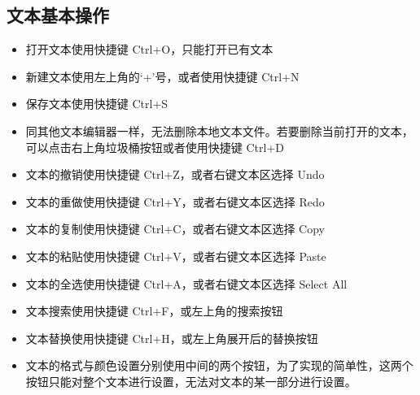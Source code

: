 \documentclass{./source/Report}
\begin{document}
\subsection{文本基本操作}
\begin{itemize}
    \item 打开文本使用快捷键 Ctrl+O，只能打开已有文本
    \item 新建文本使用左上角的‘+’号，或者使用快捷键 Ctrl+N
    \item 保存文本使用快捷键 Ctrl+S
    \item 同其他文本编辑器一样，无法删除本地文本文件。若要删除当前打开的文本，可以点击右上角垃圾桶按钮或者使用快捷键 Ctrl+D
    \item 文本的撤销使用快捷键 Ctrl+Z，或者右键文本区选择 Undo
    \item 文本的重做使用快捷键 Ctrl+Y，或者右键文本区选择 Redo
    \item 文本的复制使用快捷键 Ctrl+C，或者右键文本区选择 Copy
    \item 文本的粘贴使用快捷键 Ctrl+V，或者右键文本区选择 Paste
    \item 文本的全选使用快捷键 Ctrl+A，或者右键文本区选择 Select All    
    \item 文本搜索使用快捷键 Ctrl+F，或左上角的搜索按钮
    \item 文本替换使用快捷键 Ctrl+H，或左上角展开后的替换按钮
    \item 文本的格式与颜色设置分别使用中间的两个按钮，为了实现的简单性，这两个按钮只能对整个文本进行设置，无法对文本的某一部分进行设置。
\end{itemize}
\end{document}
